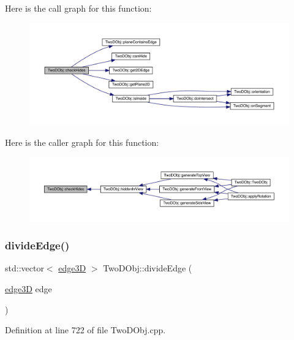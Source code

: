 Here is the call graph for this function\+:
\nopagebreak
\begin{figure}[H]
\begin{center}
\leavevmode
\includegraphics[width=350pt]{class_two_d_obj_acd188f5b49cd1d8c21fde2d8646294fe_cgraph}
\end{center}
\end{figure}
Here is the caller graph for this function\+:
\nopagebreak
\begin{figure}[H]
\begin{center}
\leavevmode
\includegraphics[width=350pt]{class_two_d_obj_acd188f5b49cd1d8c21fde2d8646294fe_icgraph}
\end{center}
\end{figure}
\mbox{\label{class_two_d_obj_a708cefccdc3c40a8bfa5b4c345ba95df}} 
\subsubsection{\texorpdfstring{divide\+Edge()}{divideEdge()}}
{\footnotesize\ttfamily std\+::vector$<$ \mbox{\hyperlink{structedge3_d}{edge3D}} $>$ Two\+D\+Obj\+::divide\+Edge (\begin{DoxyParamCaption}\item[{\mbox{\hyperlink{structedge3_d}{edge3D}}}]{edge }\end{DoxyParamCaption})}



Definition at line 722 of file Two\+D\+Obj.\+cpp.

\mbox{\label{class_two_d_obj_a86158be2b2314a79b2eaa262c28738d5}} 
